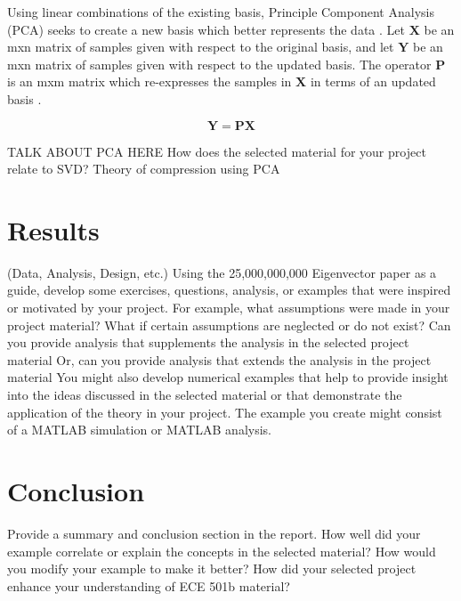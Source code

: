 \documentclass[conference]{IEEEtran}
\begin{document}
    Using linear combinations of the existing basis, Principle Component Analysis (PCA) seeks to create a new basis which better represents the data \cite{shlens_2014_tutorial}. Let $\mathbf{X}$ be an mxn matrix of samples given with respect to the original basis, and let $\mathbf{Y}$ be an mxn matrix of samples given with respect to the updated basis. The operator $\mathbf{P}$ is an mxm matrix which re-expresses the samples in $\mathbf{X}$ in terms of an updated basis \cite{shlens_2014_tutorial}.
    
    \begin{equation}
    		\mathbf{Y} = \mathbf{PX}
    \end{equation}
    
    TALK ABOUT PCA HERE
    How does the selected material for your project relate to SVD?
    Theory of compression using PCA


	\section{Results}
	(Data, Analysis, Design, etc.) Using the 25,000,000,000 Eigenvector paper as a guide, develop some exercises, questions, analysis, or examples that were inspired or motivated by your project. For example, what assumptions were made in your project material? What if certain assumptions are neglected or do not exist? Can you provide analysis that supplements the analysis in the selected project material Or, can you provide analysis that extends the analysis in the project material You might also develop numerical examples that help to provide insight into the ideas discussed in the selected material or that demonstrate the application of the theory in your project. The example you create might consist of a MATLAB simulation or MATLAB analysis.


	\section{Conclusion}
	Provide a summary and conclusion section in the report. How well did your example correlate or explain the concepts in the selected material? How would you modify your example to make it better? How did your selected project enhance your understanding of ECE 501b material?
	
	\nocite{shlens_2014_tutorial}
	\nocite{jaradet_svd_image_compression}
	\nocite{omar_image_compression}
	\nocite{xu_color_conversion}
	\newpage
	{}
	
\end{document}
